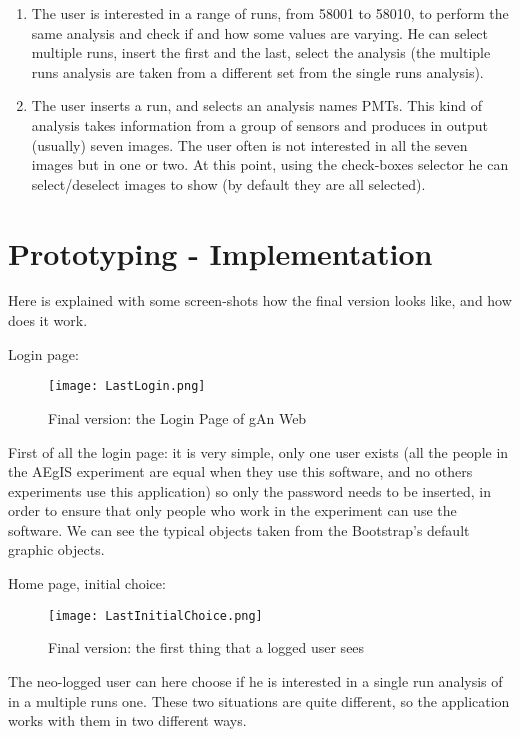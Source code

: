\begin{enumerate}
\item
The user is interested in a range of runs, from 58001 to 58010, to perform the same analysis and check if and how some values are varying. He can select multiple runs, insert the first and the last, select the analysis (the multiple runs analysis are taken from a different set from the single runs analysis).

\item
The user inserts a run, and selects an analysis names PMTs. This kind of analysis takes information from a group of sensors and produces in output (usually) seven images. The user often is not interested in all the seven images but in one or two. At this point, using the check-boxes selector he can select/deselect images to show (by default they are all selected).  

\end{enumerate}

\newpage
\section{Prototyping - Implementation}

Here is explained with some screen-shots how the final version looks like, and how does it work.

Login page:


\begin{figure}[H]
\centering
\texttt{[image: LastLogin.png]} 
\caption{Final version: the Login Page of gAn Web}
\end{figure}

First of all the login page: it is very simple, only one user exists (all the people in the AEgIS experiment are equal when they use this software, and no others experiments use this application) so only the password needs to be inserted, in order to ensure that only people who work in the experiment can use the software. We can see the typical objects taken from the Bootstrap's default graphic objects.

\newpage

Home page, initial choice:

\begin{figure}[H]
\centering
\texttt{[image: LastInitialChoice.png]} 
\caption{Final version: the first thing that a logged user sees}
\end{figure}
  
The neo-logged user can here choose if he is interested in a single run analysis of in a multiple runs one. These two situations are quite different, so the application works with them in two different ways.

